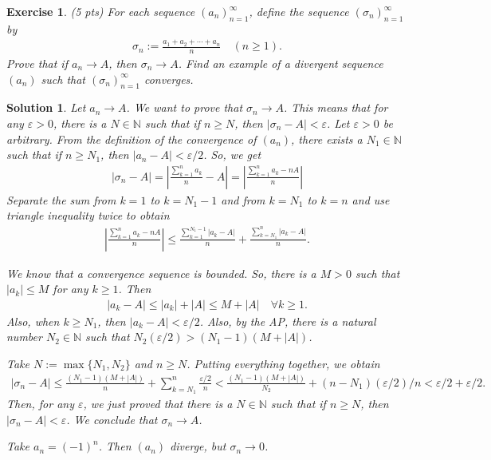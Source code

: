\documentclass[12pt]{article}
\newcommand{\bN}{\mathbb{N}}
\newcommand{\ra}{\rightarrow}
\theoremstyle{plain}
\newtheorem{exer}{\textbf{Exercise}}}
\theoremstyle{plain}
\newtheorem*{sol}{\textbf{Solution}}}
\theoremstyle{plain}
\theoremstyle{plain}
\begin{document}
\begin{exer}
(5 pts)
For each sequence $(a_n)_{n = 1}^\infty$, define the sequence $(\sigma_n)_{n = 1}^\infty$ by
	\begin{align*}
	\sigma_n := \frac{a_1 + a_2 + \cdots + a_n}{n} \quad (n \geq 1 ) .
	\end{align*}
Prove that if $a_n \ra A$, then $\sigma_n \ra A$. Find an example of a divergent sequence $(a_n)$ such that $(\sigma_n)_{n = 1}^\infty$ converges.
\end{exer}
\begin{sol}
Let $a_n \ra A$. We want to prove that $\sigma_n \ra A$. This means that for any $\varepsilon > 0$, there is a $N \in \bN$ such that if $n \geq N$, then $|\sigma_n - A| < \varepsilon$. Let $\varepsilon > 0$ be arbitrary. From the definition of the convergence of $(a_n)$, there exists a $N_1 \in \bN$ such that if $n \geq N_1$, then $|a_n - A| < \varepsilon/2$. So, we get
	\begin{align*}
	|\sigma_n - A| = \left| \frac{\sum_{k = 1}^n a_k}{n} - A \right| = \left| \frac{\sum_{k = 1}^n a_k - nA}{n} \right|
	\end{align*}
Separate the sum from $k= 1$ to $k= N_1 - 1$ and from $k= N_1$ to $k = n$ and use triangle inequality twice to obtain
	\begin{align*}
	\left| \frac{\sum_{k = 1}^n a_k - nA}{n} \right| \leq \frac{\sum_{k = 1}^{N_1 - 1} |a_k - A|}{n} + \frac{\sum_{k = N_1}^n |a_k - A|}{n} .
	\end{align*}

We know that a convergence sequence is bounded. So, there is a $M > 0$ such that $|a_k| \leq M$ for any $k \geq 1$. Then 
	\begin{align*}
	|a_k - A| \leq |a_k| + |A| \leq M + |A| \quad \forall k \geq 1 .
	\end{align*}
Also, when $k \geq N_1$, then $|a_k - A| < \varepsilon/2$. Also, by the AP, there is a natural number $N_2 \in \bN$ such that $N_2 (\varepsilon /2) > (N_1 - 1) (M + |A|)$. 

Take $N := \max \{ N_1 , N_2 \}$ and $n \geq N$. Putting everything together, we obtain
	\begin{align*}
	| \sigma_n - A | \leq \frac{(N_1 - 1) (M + |A|)}{n} + \sum_{k = N_1}^n \frac{\varepsilon/2}{n} < \frac{(N_1 - 1) (M + |A|)}{N_2} + (n - N_1)(\varepsilon/2) /n  < \varepsilon/2 + \varepsilon/2 .
	\end{align*}
Then, for any $\varepsilon$, we just proved that there is a $N \in \bN$ such that if $n \geq N$, then $|\sigma_n - A| < \varepsilon$. We conclude that $\sigma_n \ra A$.

Take $a_n = (-1)^n$. Then $(a_n)$ diverge, but $\sigma_n \ra 0$.
\end{sol}
\end{document}
